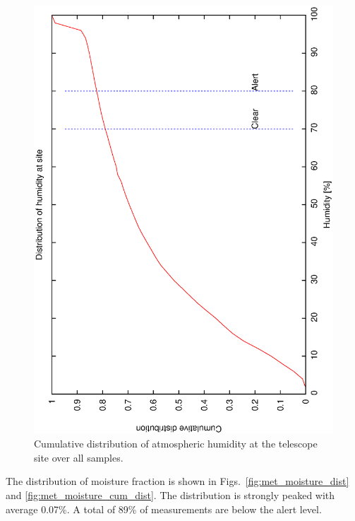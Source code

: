 \begin{figure}[htbp]
\begin{center}
    \includegraphics[scale=0.4, angle=-90]{figures/ecs/hum_cum.dat.eps}
\end{center} 
\caption[Cumulative distribution of humidity at telescope site.]
{Cumulative distribution of atmospheric humidity at the telescope site over all samples.}
\label{fig:met_humidity_cum_dist}
\end{figure}

The distribution of moisture fraction is shown in Figs.~\ref{fig:met_moisture_dist} and \ref{fig:met_moisture_cum_dist}. The distribution is strongly peaked with average 0.07\%. A total of 89\% of measurements are below the alert level.


